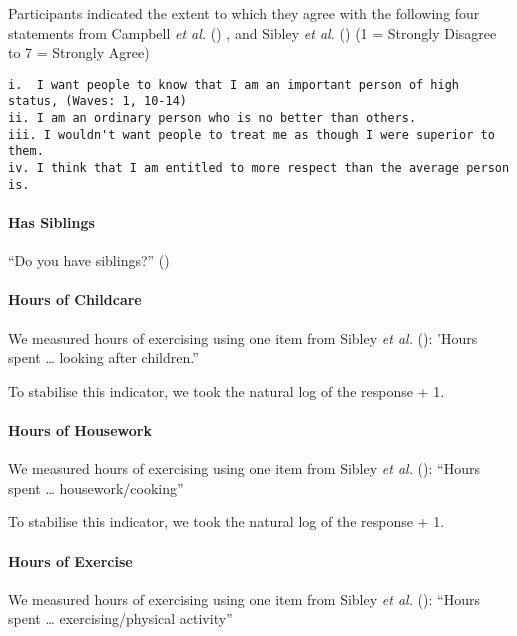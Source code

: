 \documentclass[
  single column]{article}
\let\oldparagraph\paragraph
\renewcommand{\paragraph}[1]{\oldparagraph{#1}\mbox{}}
\begin{document}
Participants indicated the extent to which they agree with the following
four statements from Campbell \emph{et al.}
() , and Sibley \emph{et al.}
() (1 = Strongly Disagree to 7 = Strongly
Agree)

\begin{verbatim}
i.  I want people to know that I am an important person of high status, (Waves: 1, 10-14)
ii. I am an ordinary person who is no better than others.
iii. I wouldn't want people to treat me as though I were superior to them.
iv. I think that I am entitled to more respect than the average person is.
\end{verbatim}

\paragraph{Has Siblings}\label{has-siblings}

``Do you have siblings?'' ()

\paragraph{Hours of Childcare}\label{hours-of-childcare}

We measured hours of exercising using one item from Sibley \emph{et al.}
(): 'Hours spent \ldots{} looking after
children.''

To stabilise this indicator, we took the natural log of the response +
1.

\paragraph{Hours of Housework}\label{hours-of-housework}

We measured hours of exercising using one item from Sibley \emph{et al.}
(): ``Hours spent \ldots{}
housework/cooking''

To stabilise this indicator, we took the natural log of the response +
1.

\paragraph{Hours of Exercise}\label{hours-of-exercise}

We measured hours of exercising using one item from Sibley \emph{et al.}
(): ``Hours spent \ldots{}
exercising/physical activity''
\end{document}
